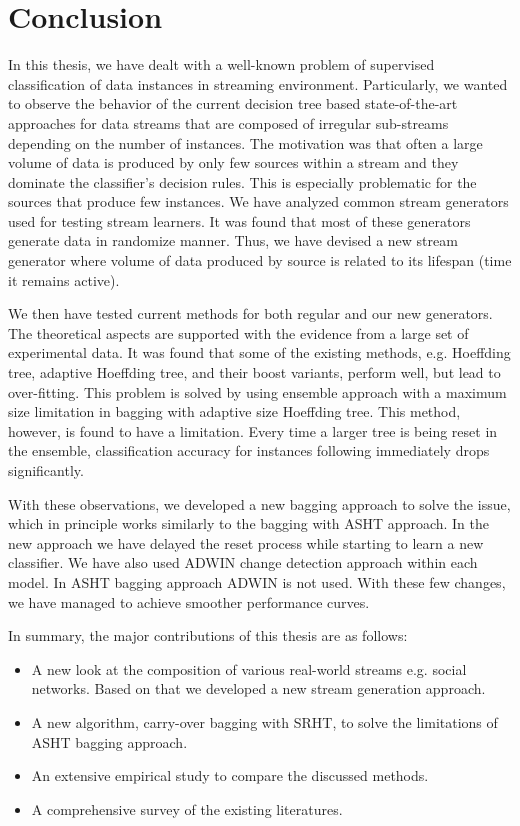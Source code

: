 \chapter{Conclusion}
\label{chp:conclude}

In this thesis, we have dealt with a well-known problem of supervised classification of data instances in streaming environment. Particularly, we wanted to observe the behavior of the current decision tree based state-of-the-art approaches for data streams that are composed of irregular sub-streams depending on the number of instances. The motivation was that often a large volume of data is produced by only few sources within a stream and they dominate the classifier's decision rules. This is especially problematic for the sources that produce few instances. We have analyzed common stream generators used for testing stream learners. It was found that most of these generators generate data in randomize manner. Thus, we have devised a new stream generator where volume of data produced by source is  related to its lifespan (time it remains active). 

We then have tested current methods for both regular and our new generators. The theoretical aspects are supported with the evidence from a large set of experimental data. It was found that some of the existing methods, e.g. Hoeffding tree, adaptive Hoeffding tree, and their boost variants, perform well, but lead to over-fitting. This problem is solved by using ensemble approach with a maximum size limitation in bagging with adaptive size Hoeffding tree. This method, however, is found to have a limitation. Every time a larger tree is being reset in the ensemble, classification accuracy for instances following immediately drops significantly. 

With these observations, we developed a new bagging approach  to solve the issue, which in principle works similarly to the bagging with ASHT approach. In the new approach we have delayed the reset process while starting to learn a new classifier. We have also used ADWIN change detection approach within each model. In ASHT bagging approach ADWIN is not used. With these few changes, we have managed to achieve smoother performance curves.

In summary, the major contributions of this thesis are as follows:

\begin{itemize}
    \item A new look at the composition of various real-world streams e.g. social networks. Based on that we developed a new stream generation approach.
    
    \item A new algorithm, carry-over bagging with SRHT, to solve the limitations of ASHT bagging approach.
    
    \item An extensive empirical study to compare the discussed methods.
    
    \item A comprehensive survey of the existing literatures.
\end{itemize}

